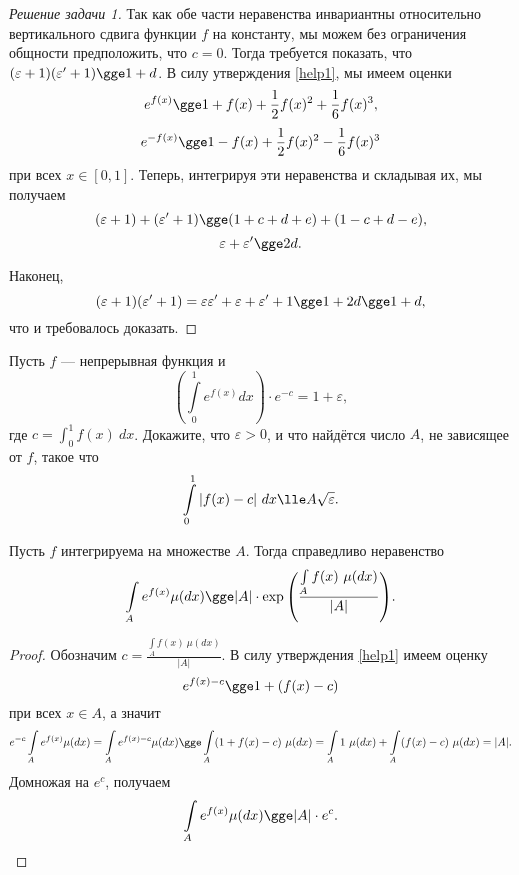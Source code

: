 \documentclass[a4paper, 12pt]{article}
\begin{document}
\begin{proof}[Решение задачи 1]
    Так как обе части неравенства инвариантны относительно вертикального сдвига функции \(f\) на константу, мы можем без ограничения общности предположить, что \(c = 0\). Тогда требуется показать, что \((\varepsilon + 1)(\varepsilon' + 1) \gge 1 + d\). В силу утверждения \ref{help1}, мы имеем оценки \[e^{f(x)} \gge 1 + f(x) + \frac{1}{2}f(x)^2 + \frac{1}{6}f(x)^3,\] \[e^{-f(x)} \gge 1 - f(x) + \frac{1}{2}f(x)^2 - \frac{1}{6}f(x)^3\] при всех \(x \in [0,1]\). Теперь, интегрируя эти неравенства и складывая их, мы получаем \[(\varepsilon + 1) + (\varepsilon' + 1) \gge (1 + c + d + e) + (1 -c + d - e),\] \[\varepsilon + \varepsilon' \gge 2d.\]
    
    Наконец, \[(\varepsilon + 1)(\varepsilon' + 1) = \varepsilon \varepsilon' + \varepsilon + \varepsilon' + 1 \gge 1 + 2d \gge 1 + d,\] что и требовалось доказать.
\end{proof}

\begin{problem}
    Пусть \(f\) --- непрерывная функция и \[\left(\int\limits_0^1 e^{f(x)} dx\right) \cdot e^{-c} = 1 + \varepsilon,\] где \(c = \int_0^1 f(x) \ dx\). Докажите, что \(\varepsilon > 0\), и что найдётся число \(A\), не зависящее от \(f\), такое что \[\int\limits_0^1 |f(x) - c| \ dx \lle A \sqrt{\varepsilon}.\]
\end{problem}

\begin{statement}\label{help2}
    Пусть \(f\) интегрируема на множестве \(A\). Тогда справедливо неравенство \[\int\limits_A e^{f(x)} \mu(dx) \gge |A| \cdot \exp{\left(\frac{\int\limits_A f(x) \ \mu(dx)}{|A|}\right)}.\]
\end{statement}
\begin{proof}
    Обозначим \(c = \frac{\int\limits_A f(x) \ \mu(dx)}{|A|}\). В силу утверждения \ref{help1} имеем оценку \[e^{f(x)-c} \gge 1 + (f(x) - c)\] при всех \(x \in A\), а значит \[e^{-c} \int\limits_A e^{f(x)} \mu(dx) = \int\limits_A e^{f(x) - c} \mu(dx) \gge \int\limits_A (1 + f(x) - c)\ \mu(dx) = \int\limits_A 1 \ \mu(dx) + \int\limits_A (f(x) - c)\ \mu(dx) = |A|.\] Домножая на \(e^c\), получаем \[\int\limits_A e^{f(x)} \mu(dx) \gge |A| \cdot e^c.\]
\end{proof}
\end{document}
